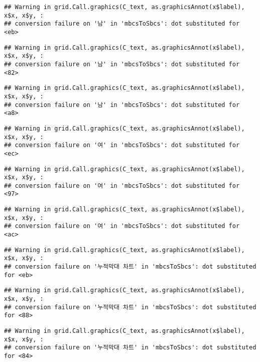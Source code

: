 \documentclass[
]{article}
\begin{document}
\begin{verbatim}
## Warning in grid.Call.graphics(C_text, as.graphicsAnnot(x$label), x$x, x$y, :
## conversion failure on '남' in 'mbcsToSbcs': dot substituted for <eb>
\end{verbatim}

\begin{verbatim}
## Warning in grid.Call.graphics(C_text, as.graphicsAnnot(x$label), x$x, x$y, :
## conversion failure on '남' in 'mbcsToSbcs': dot substituted for <82>
\end{verbatim}

\begin{verbatim}
## Warning in grid.Call.graphics(C_text, as.graphicsAnnot(x$label), x$x, x$y, :
## conversion failure on '남' in 'mbcsToSbcs': dot substituted for <a8>
\end{verbatim}

\begin{verbatim}
## Warning in grid.Call.graphics(C_text, as.graphicsAnnot(x$label), x$x, x$y, :
## conversion failure on '여' in 'mbcsToSbcs': dot substituted for <ec>
\end{verbatim}

\begin{verbatim}
## Warning in grid.Call.graphics(C_text, as.graphicsAnnot(x$label), x$x, x$y, :
## conversion failure on '여' in 'mbcsToSbcs': dot substituted for <97>
\end{verbatim}

\begin{verbatim}
## Warning in grid.Call.graphics(C_text, as.graphicsAnnot(x$label), x$x, x$y, :
## conversion failure on '여' in 'mbcsToSbcs': dot substituted for <ac>
\end{verbatim}

\begin{verbatim}
## Warning in grid.Call.graphics(C_text, as.graphicsAnnot(x$label), x$x, x$y, :
## conversion failure on '누적막대 차트' in 'mbcsToSbcs': dot substituted for <eb>
\end{verbatim}

\begin{verbatim}
## Warning in grid.Call.graphics(C_text, as.graphicsAnnot(x$label), x$x, x$y, :
## conversion failure on '누적막대 차트' in 'mbcsToSbcs': dot substituted for <88>
\end{verbatim}

\begin{verbatim}
## Warning in grid.Call.graphics(C_text, as.graphicsAnnot(x$label), x$x, x$y, :
## conversion failure on '누적막대 차트' in 'mbcsToSbcs': dot substituted for <84>
\end{verbatim}
\end{document}
